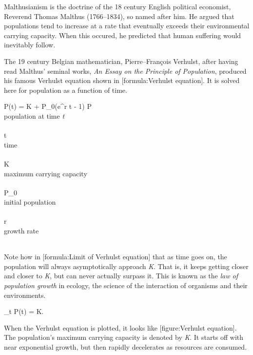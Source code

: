 Malthusianism is the doctrine of the 18 century English political economist, Reverend Thomas Malthus (1766--1834), so named after him. He argued that populations tend to increase at a rate that eventually exceeds their environmental carrying capacity. When this occured, he predicted that human suffering would inevitably follow.\footnotecite[malthus1798]

The 19 century Belgian mathematician, Pierre--François Verhulst, after having read Malthus' seminal works, {\it An Essay on the Principle of Population}, produced his famous Verhulst equation shown in [formula:Verhulst equation]. It is solved here for population as a function of time.
\crlf

\startformula
P(t) = 
             {K + P_0(e^{r t} - 1)}
\stopformula
\startlegend
\leg P \\ population at time {\it t} \\ \\
\leg t \\ time \\ \\
\leg K \\ maximum carrying capacity \\ \\
\leg P_0 \\ initial population \\ \\
\leg r \\ growth rate \\ \\
\stoplegend
\crlf

Note how in [formula:Limit of Verhulst equation] that as time goes on, the population will always asymptotically approach {\it K}. That is, it keeps getting closer and closer to {\it K}, but can never actually surpass it. This is known as the {\it law of population growth} in ecology, the science of the interaction of organisms and their environments.
\crlf

\startformula
\lim_{t\to\infty} P(t) = K.
\stopformula
\crlf

When the Verhulst equation is plotted, it looks like [figure:Verhulst equation]. The population's maximum carrying capacity is denoted by {\it K}. It starts off with near exponential growth, but then rapidly decelerates as resources are consumed.

